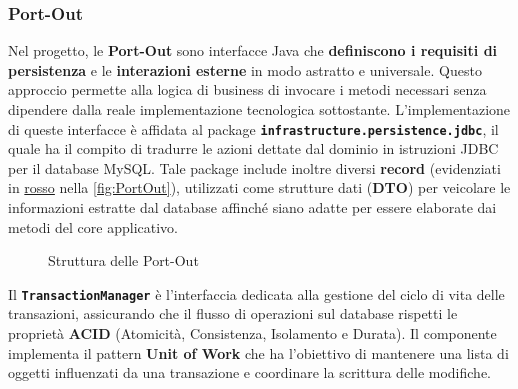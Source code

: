 \documentclass[a4paper,11pt]{article}
\begin{document}
\subsubsection{Port-Out}
Nel progetto, le \textbf{Port-Out} sono interfacce Java che \textbf{definiscono i requisiti di persistenza} e le \textbf{interazioni esterne} in modo astratto e universale. Questo approccio permette alla logica di business di invocare i metodi necessari senza dipendere dalla reale implementazione tecnologica sottostante. L'implementazione di queste interfacce è affidata al package \textbf{\texttt{infrastructure.persistence.jdbc}}, il quale ha il compito di tradurre le azioni dettate dal dominio in istruzioni JDBC per il database MySQL. Tale package include inoltre diversi \textbf{record} (evidenziati in \underline{rosso} nella \autoref{fig:PortOut}), utilizzati come strutture dati (\textbf{DTO}) per veicolare le informazioni estratte dal database affinché siano adatte per essere elaborate dai metodi del core applicativo.

\begin{figure}[H]
	\centering
	\begin{minipage}[t]{0.48\textwidth}
	\end{minipage}
	\hfill
	\begin{minipage}[t]{0.48\textwidth}
	\end{minipage}
	\caption{Struttura delle Port-Out}
	\label{fig:PortOut}
\end{figure}

Il \textbf{\texttt{TransactionManager}} è l'interfaccia dedicata alla gestione del ciclo di vita delle transazioni, assicurando che il flusso di operazioni sul database rispetti le proprietà \textbf{ACID} (Atomicità, Consistenza, Isolamento e Durata). Il componente implementa il pattern \textbf{Unit of Work} che ha l'obiettivo di mantenere una lista di oggetti influenzati da una transazione e coordinare la scrittura delle modifiche.
\end{document}
